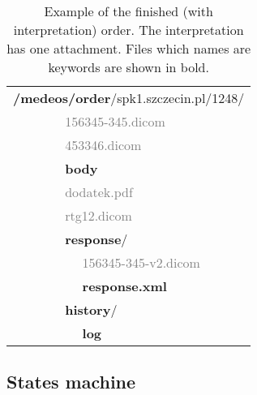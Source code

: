 \documentclass[a4paper]{article}
\begin{document}
\begin{table}
\begin{center}
\begin{tabular}{ p{2cm} p{.2cm} p{.2cm} p{.2cm} p{4cm} }
  \multicolumn{5}{l}{\textbf{/medeos/order}/spk1.szczecin.pl/1248/} \\
   & & & \multicolumn{2}{l}{\textcolor{gray}{156345-345.dicom}} \\
   & & & \multicolumn{2}{l}{\textcolor{gray}{453346.dicom}} \\
   & & & \multicolumn{2}{l}{\textbf{body}} \\
   & & & \multicolumn{2}{l}{\textcolor{gray}{dodatek.pdf}} \\
   & & & \multicolumn{2}{l}{\textcolor{gray}{rtg12.dicom}} \\
   & & & \multicolumn{2}{l}{\textbf{response}/} \\
   & & & & \textcolor{gray}{156345-345-v2.dicom} \\
   & & & & \textbf{response.xml} \\
   & & & \multicolumn{2}{l}{\textbf{history}/} \\
   & & & & \textbf{log} \\
\end{tabular}
\caption[Example finished order]{Example of the finished (with interpretation)
order. The interpretation has one attachment. Files which names are keywords are
shown in bold.}
\label{tab:dir}
\end{center}
\end{table}

\subsection{States machine}
\end{document}
